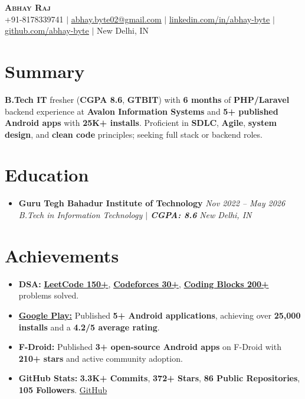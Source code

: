 \documentclass[letterpaper,11pt]{article}
\newcommand{\resumeItem}[1]{
  \item\small{#1 \vspace{-2pt}}
}
\newcommand{\resumeSubHeadingListStart}{\begin{itemize}[leftmargin=0.15in, label={}, itemsep=4pt, topsep=6pt, parsep=0pt]}
\newcommand{\resumeSubHeadingListStartCompact}{\begin{itemize}[leftmargin=0.15in, label={}, itemsep=4pt, topsep=6pt, parsep=0pt]}
\newcommand{\resumeSubHeadingListEnd}{\end{itemize}}
\begin{document}
\begin{center}
  \textbf{\Huge \scshape Abhay Raj} \\ \vspace{1pt}
  \small +91-8178339741 $|$ \href{mailto:abhay.byte02@gmail.com}{\underline{abhay.byte02@gmail.com}} $|$
  \href{https://linkedin.com/in/abhay-byte}{\underline{linkedin.com/in/abhay-byte}} $|$
  \href{https://github.com/abhay-byte}{\underline{github.com/abhay-byte}} $|$
  New Delhi, IN
\end{center}
\vspace{-10pt}

\section{Summary}
\small{\textbf{B.Tech IT} fresher (\textbf{CGPA 8.6}, \textbf{GTBIT}) with \textbf{6 months} of \textbf{PHP/Laravel} backend experience at \textbf{Avalon Information Systems} and \textbf{5+ published Android apps} with \textbf{25K+ installs}. Proficient in \textbf{SDLC}, \textbf{Agile}, \textbf{system design}, and \textbf{clean code} principles; seeking full stack or backend roles.}

\section{Education}
\vspace{4pt}
\resumeSubHeadingListStart
  \vspace{-2pt}\item
  \textbf{Guru Tegh Bahadur Institute of Technology} \hfill \textit{\small Nov 2022 -- May 2026} \\
  \textit{\small B.Tech in Information Technology $|$ \textbf{CGPA: 8.6}} \hfill \textit{\small New Delhi, IN}
  \vspace{-7pt}
\resumeSubHeadingListEnd

\section{Achievements}
\resumeSubHeadingListStartCompact
  \resumeItem{\textbf{DSA:} \href{https://leetcode.com/u/abhay-byte/}{\textbf{LeetCode 150+}}, \href{https://codeforces.com/profile/abhay.byte02}{\textbf{Codeforces 30+}}, \href{https://hack.codingblocks.com/app/users/421726}{\textbf{Coding Blocks 200+}} problems solved.}
  \resumeItem{\href{https://play.google.com/store/apps/dev?id=4853829560344310989}{\textbf{Google Play:}} Published \textbf{5+ Android applications}, achieving over \textbf{25,000 installs} and a \textbf{4.2/5 average rating}.}
  \resumeItem{\textbf{F-Droid:} Published \textbf{3+ open-source Android apps} on F-Droid with \textbf{210+ stars} and active community adoption.}
  \resumeItem{\textbf{GitHub Stats:} \textbf{3.3K+ Commits}, \textbf{372+ Stars}, \textbf{86 Public Repositories}, \textbf{105 Followers}. \href{https://github.com/abhay-byte}{GitHub}}
\resumeSubHeadingListEnd
\end{document}
